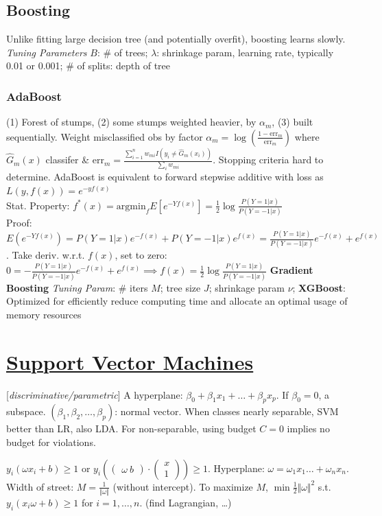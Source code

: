 \documentclass[9pt]{article}
\theoremstyle{definition}
\begin{document}
\begin{multicols}{2}
\subsection{Boosting}
Unlike fitting large decision tree (and potentially overfit), boosting learns slowly.  \textit{Tuning Parameters} $B$: \# of trees; $\lambda$: shrinkage param, learning rate, typically 0.01 or 0.001; \# of splits: depth of tree \\
\subsubsection{AdaBoost}
(1) Forest of stumps, (2) some stumps weighted heavier, by $\alpha_m$, (3) built sequentially.
Weight misclassified obs by factor $\alpha_m=\log\left(\frac{1-\text{err}_m}{\text{err}_m}\right)$ where $\hat G_m(x)$ classifer \& ${\displaystyle \text{err}_m=\frac{\sum_{i=1}^n w_{mi}I(y_i\neq\hat G_m(x_i))}{\sum_i w_{mi}}}$.  Stopping criteria hard to determine.  AdaBoost is equivalent to forward stepwise additive with loss as $L(y,f(x)) = e^{-yf(x)}$\\
Stat. Property: $f^*(x) = \text{argmin}_f E\left[e^{-Yf(x)}\right] = \frac{1}{2}\log\frac{P(Y=1|x)}{P(Y=-1|x)}$\\
Proof:$E(e^{-Yf(x)})=P(Y=1|x)e^{-f(x)}+P(Y=-1|x)e^{f(x)}= \frac{P(Y=1|x)}{P(Y=-1|x)}e^{-f(x)}+e^{f(x)}$. Take deriv. w.r.t. $f(x)$, set to zero: $0=-\frac{P(Y=1|x)}{P(Y=-1|x)}e^{-f(x)}+e^{f(x)}\implies f(x) = \frac{1}{2}\log\frac{P(Y=1|x)}{P(Y=-1|x)}$
\textbf{Gradient Boosting}
\textit{Tuning Param}: \# iters $M$; tree size $J$; shrinkage param $\nu$; 
\textbf{XGBoost}: Optimized for efficiently reduce computing time and allocate an optimal usage of memory resources
\section{\href{https://www.youtube.com/watch?v=LXGaYVXkGtg}{Support Vector Machines}}
[\textit{discriminative/parametric}] A hyperplane: $\beta_0+\beta_1x_1+\dots+\beta_px_p$. If $\beta_0=0$, a subspace.  $(\beta_1,\beta_2,\dots,\beta_p)$: normal vector.  When classes nearly separable, SVM better than LR, also LDA.  For non-separable, using budget $C=0$ implies no budget for violations.

$y_i\left(\omega x_i+b\right)\geq 1$ or $y_i\left(\begin{pmatrix}\omega\ b\end{pmatrix}\cdot\begin{pmatrix}x\\ 1\end{pmatrix}\right)\geq 1$.  Hyperplane: $\omega=\omega_1x_1\dots+\omega_nx_n$.  Width of street: ${\displaystyle M = \frac{1}{\Vert\omega\Vert}}$ (without intercept).  To maximize $M$, 
$\min \frac{1}{2}\Vert\omega\Vert^2$ s.t. $y_i(x_i\omega +b)\geq 1$ for $i=1,\dots,n$. (find Lagrangian, \dots)


\end{multicols}
\end{document}
